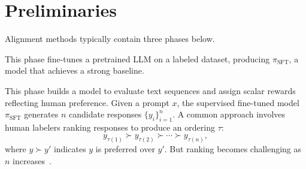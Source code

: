 \section{Preliminaries}
\label{sec:preliminaries}

Alignment methods typically contain three phases below. 

This phase fine-tunes a pretrained LLM on a labeled dataset, producing $\pi_{\text{SFT}}$, a model that achieves a strong baseline.%



This phase builds a model to evaluate text sequences and assign scalar rewards reflecting human preference. Given a prompt \( x \), the supervised fine-tuned model \( \pi_{\text{SFT}} \) generates \( n \) candidate responses \( \{y_{i}\}_{i=1}^n \). 
A common approach involves human labelers ranking responses to produce an ordering \( \tau \):  
\begin{equation}\label{ranking}
	y_{\tau(1)} \succ y_{\tau(2)} \succ \cdots \succ y_{\tau(n)},  
\end{equation}
where \( y \succ y' \) indicates \( y \) is preferred over \( y' \). But ranking becomes challenging as \( n \) increases~\cite{lambert2022illustrating}.



